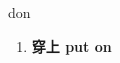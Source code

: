 
\begin{frame}
{\huge don}
\begin{center}
\begin{enumerate}\Large
  \item \textbf{穿上 put on}
\end{enumerate}
\end{center}
\end{frame}
